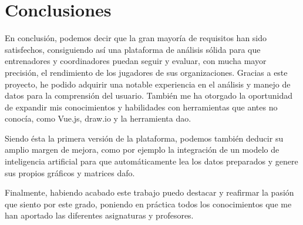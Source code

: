 
\chapter{Conclusiones}
\label{conclusiones}
En conclusión, podemos decir que la gran mayoría de requisitos han sido satisfechos, consiguiendo así una plataforma de análisis sólida para que entrenadores y coordinadores puedan seguir y evaluar, con mucha mayor precisión, el rendimiento de los jugadores de sus organizaciones. Gracias a este proyecto, he podido adquirir una notable experiencia en el análisis y manejo de datos para la comprensión del usuario. También me ha otorgado la oportunidad de expandir mis conocimientos y habilidades con herramientas que antes no conocía, como Vue.js, draw.io y la herramienta \gls{dao}.

Siendo ésta la primera versión de la plataforma, podemos también deducir su amplio margen de mejora, como por ejemplo la integración de un modelo de inteligencia artificial para que automáticamente lea los datos preparados y genere sus propios gráficos y matrices \gls{dafo}.

Finalmente, habiendo acabado este trabajo puedo destacar y reafirmar la pasión que siento por este grado, poniendo en práctica todos los conocimientos que me han aportado las diferentes asignaturas y profesores.
